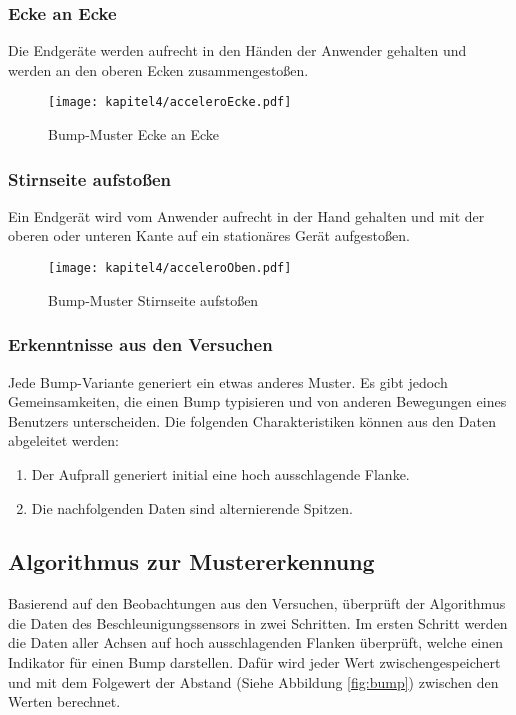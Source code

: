 \subsubsection{Ecke an Ecke}
Die Endgeräte werden aufrecht in den Händen der Anwender gehalten und werden an den oberen Ecken zusammengestoßen.
\begin{figure}[H]
    \centering
    \texttt{[image: kapitel4/acceleroEcke.pdf]}
    \caption{Bump-Muster Ecke an Ecke}
    \label{fig:eckeanecke}
\end{figure}

\subsubsection{Stirnseite aufstoßen}
Ein Endgerät wird vom Anwender aufrecht in der Hand gehalten und mit der oberen oder unteren Kante auf ein stationäres Gerät aufgestoßen.
\begin{figure}[H]
    \centering
    \texttt{[image: kapitel4/acceleroOben.pdf]}
    \caption{Bump-Muster Stirnseite aufstoßen}
    \label{fig:aufstossen}
\end{figure}

\subsubsection{Erkenntnisse aus den Versuchen}
Jede Bump-Variante generiert ein etwas anderes Muster. Es gibt jedoch Gemeinsamkeiten, die einen Bump typisieren und von anderen Bewegungen eines Benutzers unterscheiden. Die folgenden Charakteristiken können aus den Daten abgeleitet werden:
\begin{enumerate}
  \item Der Aufprall generiert initial eine hoch ausschlagende Flanke.
  \item Die nachfolgenden Daten sind alternierende Spitzen.
\end{enumerate}

\subsection{Algorithmus zur Mustererkennung}
Basierend auf den Beobachtungen aus den Versuchen, überprüft der Algorithmus die Daten des Beschleunigungssensors in zwei Schritten. Im ersten Schritt werden die Daten aller Achsen auf hoch ausschlagenden Flanken überprüft, welche einen Indikator für einen Bump darstellen. Dafür wird jeder Wert zwischengespeichert und mit dem Folgewert der Abstand (Siehe Abbildung \ref{fig:bump}) zwischen den Werten berechnet. 

